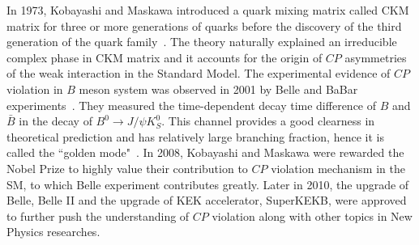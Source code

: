 In 1973, Kobayashi and Maskawa introduced a quark mixing matrix called CKM matrix for three or more generations of quarks before the discovery of the third generation of the quark family~\cite{CKM}. The theory naturally explained an irreducible complex phase in CKM matrix and it accounts for the origin of $CP$ asymmetries of the weak interaction in the Standard Model. The experimental evidence of $CP$ violation in $B$ meson system was observed in 2001 by Belle and BaBar experiments~\cite{abashian2001measurement, aubert2007babar}. They measured the time-dependent decay time difference of $B$ and $\bar{B}$ in the decay of $B^0\to J/\psi K_S^0$. This channel provides a good clearness in theoretical prediction and has relatively large branching fraction, hence it is called the ``golden mode"~\cite{bigi1989question}. In 2008, Kobayashi and Maskawa were rewarded the Nobel Prize to highly value their contribution to $CP$ violation mechanism in the SM, to which Belle experiment contributes greatly. Later in 2010, the upgrade of Belle, Belle II and the upgrade of KEK accelerator, SuperKEKB, were approved to further push the understanding of $CP$ violation along with other topics in New Physics researches. 

